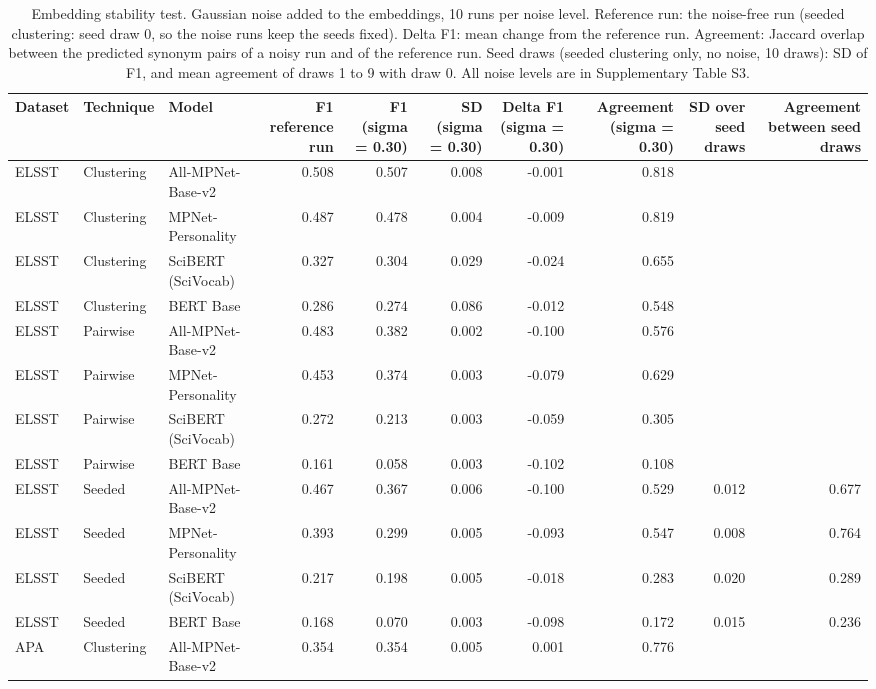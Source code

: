 \begin{table}[ht]
\centering
\small
\caption{Embedding stability test. Gaussian noise added to the embeddings, 10 runs per noise level. Reference run: the noise-free run (seeded clustering: seed draw 0, so the noise runs keep the seeds fixed). Delta F1: mean change from the reference run. Agreement: Jaccard overlap between the predicted synonym pairs of a noisy run and of the reference run. Seed draws (seeded clustering only, no noise, 10 draws): SD of F1, and mean agreement of draws 1 to 9 with draw 0. All noise levels are in Supplementary Table S3.}
\label{tab:table4_embedding_stability}
\begin{tabular}{lllrrrrrrr}
\toprule
Dataset & Technique & Model & F1 reference run & F1 (sigma = 0.30) & SD (sigma = 0.30) & Delta F1 (sigma = 0.30) & Agreement (sigma = 0.30) & SD over seed draws & Agreement between seed draws \\
\midrule
ELSST & Clustering & All-MPNet-Base-v2 & 0.508 & 0.507 & 0.008 & -0.001 & 0.818 &  &  \\
ELSST & Clustering & MPNet-Personality & 0.487 & 0.478 & 0.004 & -0.009 & 0.819 &  &  \\
ELSST & Clustering & SciBERT (SciVocab) & 0.327 & 0.304 & 0.029 & -0.024 & 0.655 &  &  \\
ELSST & Clustering & BERT Base & 0.286 & 0.274 & 0.086 & -0.012 & 0.548 &  &  \\
ELSST & Pairwise & All-MPNet-Base-v2 & 0.483 & 0.382 & 0.002 & -0.100 & 0.576 &  &  \\
ELSST & Pairwise & MPNet-Personality & 0.453 & 0.374 & 0.003 & -0.079 & 0.629 &  &  \\
ELSST & Pairwise & SciBERT (SciVocab) & 0.272 & 0.213 & 0.003 & -0.059 & 0.305 &  &  \\
ELSST & Pairwise & BERT Base & 0.161 & 0.058 & 0.003 & -0.102 & 0.108 &  &  \\
ELSST & Seeded & All-MPNet-Base-v2 & 0.467 & 0.367 & 0.006 & -0.100 & 0.529 & 0.012 & 0.677 \\
ELSST & Seeded & MPNet-Personality & 0.393 & 0.299 & 0.005 & -0.093 & 0.547 & 0.008 & 0.764 \\
ELSST & Seeded & SciBERT (SciVocab) & 0.217 & 0.198 & 0.005 & -0.018 & 0.283 & 0.020 & 0.289 \\
ELSST & Seeded & BERT Base & 0.168 & 0.070 & 0.003 & -0.098 & 0.172 & 0.015 & 0.236 \\
APA & Clustering & All-MPNet-Base-v2 & 0.354 & 0.354 & 0.005 & 0.001 & 0.776 &  &  \\

\end{tabular}
\end{table}
